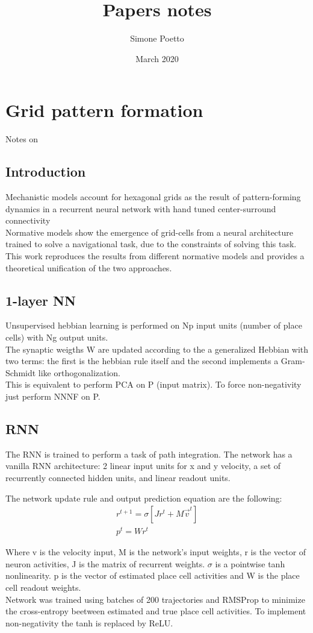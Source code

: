\documentclass{article}
\title{Papers notes}
\author{Simone Poetto}
\date{March 2020}
\begin{document}
\maketitle

\section{Grid pattern formation}
Notes on \cite{Sorscher}
\subsection{Introduction}
Mechanistic models account for hexagonal grids as the result of pattern-forming dynamics in a recurrent neural network with hand tuned center-surround connectivity\\
Normative models show the emergence of grid-cells from a neural architecture trained to solve a navigational task, due to the constraints of solving this task.
This work reproduces the results from different normative models and provides a theoretical unification of the two approaches.

\subsection{1-layer NN}
Unsupervised hebbian learning is performed on Np input units (number of place cells) with Ng output units.\\
The synaptic weigths W are updated according to the
a generalized Hebbian with two terms: the first is the hebbian rule itself and the second implements a Gram-Schmidt like orthogonalization.\\
This is equivalent to perform PCA on P (input matrix).
To force non-negativity just perform NNNF on P.
\newpage
\subsection{RNN}
The RNN is trained to perform a task of path integration.
The network has a vanilla RNN architecture: 2 linear input units for x and y velocity, a set of recurrently connected hidden units, and linear readout units.

The network update rule and output prediction equation are the following:
$$
\begin{array}{c}r^{t+1}=\sigma\left[J r^{t}+M \vec{v}^{t}\right] \\ p^{t}=W r^{t}\end{array}
$$

Where v is the velocity input, M is the network's input weights, r is the vector of neuron activities, J is the matrix of recurrent weights. $\sigma$ is a pointwise tanh nonlinearity. p is the vector of estimated place cell activities and W is the place cell readout weights.\\
Network was trained using batches of 200 trajectories and RMSProp to minimize the cross-entropy beetween estimated and true place cell activities. To implement non-negativity the tanh is replaced by ReLU.
\end{document}
